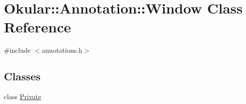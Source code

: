 \hypertarget{classOkular_1_1Annotation_1_1Window}{\section{Okular\+:\+:Annotation\+:\+:Window Class Reference}
\label{classOkular_1_1Annotation_1_1Window}
}


{\ttfamily \#include $<$annotations.\+h$>$}

\subsection*{Classes}
\begin{DoxyCompactItemize}
\item 
class \hyperlink{classAnnotation_1_1Window_1_1Private}{Private}
\end{DoxyCompactItemize}
